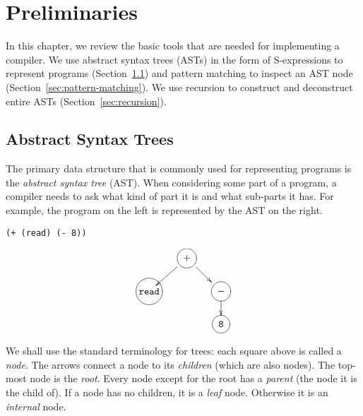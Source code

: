 \documentclass[12pt]{book}
\begin{document}

\chapter{Preliminaries}
\label{ch:trees-recur}

In this chapter, we review the basic tools that are needed for
implementing a compiler. We use abstract syntax trees (ASTs) in the
form of S-expressions to represent programs (Section~\ref{sec:ast})
and pattern matching to inspect an AST node
(Section~\ref{sec:pattern-matching}).  We use recursion to construct
and deconstruct entire ASTs (Section~\ref{sec:recursion}).

\section{Abstract Syntax Trees}
\label{sec:ast}

The primary data structure that is commonly used for representing
programs is the \emph{abstract syntax tree} (AST). When considering
some part of a program, a compiler needs to ask what kind of part it
is and what sub-parts it has. For example, the program on the left is
represented by the AST on the right.
\begin{center}
\begin{minipage}{0.4\textwidth}
\begin{lstlisting}
(+ (read) (- 8))
\end{lstlisting}
\end{minipage}
\begin{minipage}{0.4\textwidth}
\begin{equation}
\xymatrix@=15pt{
    & *++[Fo]{+} \ar[dl]\ar[dr]& \\
*+[Fo]{\tt read}  &   & *++[Fo]{-} \ar[d] \\
    &   & *++[Fo]{\tt 8} 
} \label{eq:arith-prog}
\end{equation}
\end{minipage}
\end{center}
We shall use the standard terminology for trees: each square above is
called a \emph{node}. The arrows connect a node to its \emph{children}
(which are also nodes). The top-most node is the \emph{root}.  Every
node except for the root has a \emph{parent} (the node it is the child
of). If a node has no children, it is a \emph{leaf} node.  Otherwise
it is an \emph{internal} node.
\end{document}
